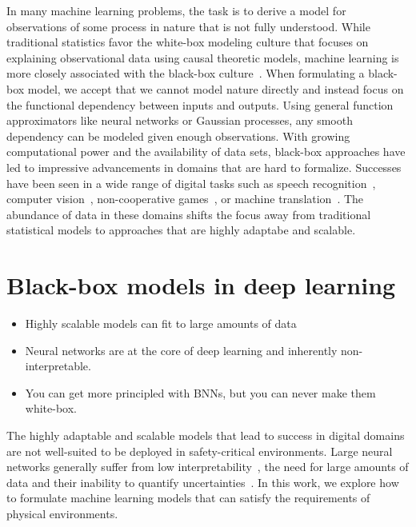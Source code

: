 In many machine learning problems, the task is to derive a model for observations of some process in nature that is not fully understood.
While traditional statistics favor the white-box modeling culture that focuses on explaining observational data using causal theoretic models, machine learning is more closely associated with the black-box culture~\parencite{breiman_statistical_2001,shmueli_explain_2010}.
When formulating a black-box model, we accept that we cannot model nature directly and instead focus on the functional dependency between inputs and outputs.
Using general function approximators like neural networks or Gaussian processes, any smooth dependency can be modeled given enough observations.
With growing computational power and the availability of data sets, black-box approaches have led to impressive advancements in domains that are hard to formalize.
Successes have been seen in a wide range of digital tasks such as speech recognition~\parencite{hochreiter_long_1997,chorowski_attention-based_2015,bahdanau_neural_2014,chorowski_attention-based_2015}, computer vision~\parencite{russakovsky_imagenet_2015,lecun_backpropagation_1989}, non-cooperative games~\parencite{berner_dota_2019,silver_mastering_2016}, or machine translation~\parencite{johnson_googles_2017}.
The abundance of data in these domains shifts the focus away from traditional statistical models to approaches that are highly adaptabe and scalable.


\section{Black-box models in deep learning}
\begin{itemize}
    \item Highly scalable models can fit to large amounts of data
    \item Neural networks are at the core of deep learning and inherently non-interpretable.
    \item You can get more principled with BNNs, but you can never make them white-box.
\end{itemize}

The highly adaptable and scalable models that lead to success in digital domains are not well-suited to be deployed in safety-critical environments.
Large neural networks generally suffer from low interpretability~\parencite{rudin_stop_2019}, the need for large amounts of data and their inability to quantify uncertainties~\parencite{goodfellow_deep_2016}.
In this work, we explore how to formulate machine learning models that can satisfy the requirements of physical environments.

